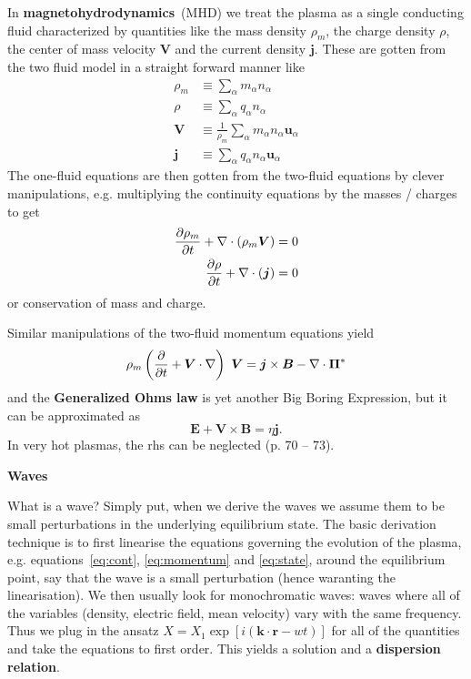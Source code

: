 \documentclass[10pt,landscape]{article}
\renewcommand{\vec}{\bm}
\newcommand{\topiccolor}{green}
\renewcommand{\section}[2]{%
	\renewcommand{\topiccolor}{#2}
	\begin{tcolorbox}[boxsep=0.5mm, left=1mm, right=1mm, top=0mm, bottom=0mm,
		colback=#2!30, colframe=#2, arc is angular]%
		\centering \textbf{#1}%
	\end{tcolorbox}%
	\nopagebreak%
}
\newcommand{\cbf}[1]{\textcolor{\topiccolor!80!black}{\textbf{#1}}}
\begin{document}
\begin{multicols*}{3}
In \cbf{magnetohydrodynamics} (MHD) we treat the plasma as a single conducting
fluid characterized by quantities like the mass density $\rho_m$, the charge
density $\rho$, the center of mass velocity $\vec V$ and the current density
$\vec j$.
These are gotten from the two fluid model in a straight forward manner like
\begin{align*}
	\rho_m &\equiv \sum_\alpha m_\alpha n_\alpha\\
	\rho &\equiv \sum_\alpha q_\alpha n_\alpha\\
	\vec V &\equiv \frac{1}{\rho_m} \sum_\alpha m_\alpha n_\alpha \vec u_\alpha\\
	\vec j &\equiv \sum_\alpha q_\alpha n_\alpha \vec u_\alpha
\end{align*}
The one-fluid equations are then gotten from the two-fluid equations by clever
manipulations, e.g. multiplying the continuity equations by the masses / charges
to get
\begin{align*}
	\diffp{\rho_m}{t} + \nabla \cdot (\rho_m \vec V) = 0\\
	\diffp{\rho}{t} + \nabla \cdot (\vec j) = 0
\end{align*}
or conservation of mass and charge.

Similar manipulations of the two-fluid momentum equations yield
\[
	\rho_m\left(\diffp{}{t} + \vec V \cdot \nabla\right) \vec V
	= \vec j \times \vec B - \nabla \cdot \vec \Pi^*
\]
and the \cbf{Generalized Ohms law} is yet another Big Boring
Expression\texttrademark, but it can be approximated as
\[
	\vec E + \vec V \times \vec B = \eta \vec j.
\]
In very hot plasmas, the rhs can be neglected (p. 70 -- 73).


\section{Waves}{red}

What is a wave?
Simply put, when we derive the waves we assume them to be small
perturbations in the underlying equilibrium state.
The basic derivation technique is
to first linearise the equations governing the evolution of the plasma,
e.g. equations~\eqref{eq:cont}, \eqref{eq:momentum} and \eqref{eq:state},
around the equilibrium point, say that the wave is a small perturbation
(hence waranting the linearisation).
We then usually look for monochromatic waves:
waves where all of the variables
(density, electric field, mean velocity)
vary with the same frequency.
Thus we plug in the ansatz $X = X_1 \exp[i(\vec k \cdot \vec r - w t)]$
for all of the quantities and take the equations to first order.
This yields a solution and a \cbf{dispersion relation}.


\end{multicols*}
\end{document}
